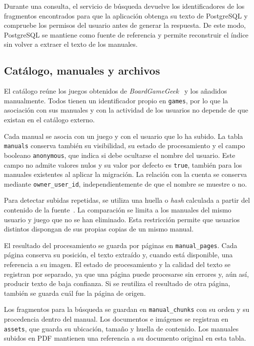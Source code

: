 Durante una consulta, el servicio de búsqueda devuelve los identificadores
de los fragmentos encontrados para que la aplicación obtenga su texto de
PostgreSQL y compruebe los permisos del usuario antes de generar la
respuesta. De este modo, PostgreSQL se mantiene como fuente de referencia
y permite reconstruir el índice sin volver a extraer el texto de los
manuales.

\FloatBarrier
\subsection{Catálogo, manuales y archivos}

El catálogo reúne los juegos obtenidos de \textit{BoardGameGeek}~\cite{boardgamegeek} y los añadidos
manualmente. Todos tienen un identificador propio en \texttt{games}, por lo
que la asociación con sus manuales y con la actividad de los usuarios no
depende de que existan en el catálogo externo.

Cada manual se asocia con un juego y con el usuario que lo ha subido. La tabla
\texttt{manuals} conserva también su visibilidad, su estado de procesamiento
y el campo booleano \texttt{anonymous}, que indica si debe ocultarse el nombre
del usuario. Este campo no admite valores nulos y su valor por defecto es
\texttt{true}, también para los manuales existentes al aplicar la migración.
La relación con la cuenta se conserva mediante \texttt{owner\_user\_id},
independientemente de que el nombre se muestre o no.

Para detectar subidas repetidas, se utiliza una huella o \textit{hash}
calculada a partir del contenido de la fuente~\cite{quinlan_venti}.
La comparación se limita a los manuales del mismo usuario y juego que no se
han eliminado.
Esta restricción permite que usuarios distintos dispongan de sus propias copias
de un mismo manual.

El resultado del procesamiento se guarda por páginas en
\texttt{manual\_\allowbreak{}pages}. Cada página conserva su posición, el texto
extraído y, cuando está disponible, una referencia a su imagen. El estado de
procesamiento y la calidad del texto se registran por separado, ya que una página puede
procesarse sin errores y, aún así, producir texto de baja confianza. Si se reutiliza
el resultado de otra página, también se guarda cuál fue la página de origen.

Los fragmentos para la búsqueda se guardan en
\texttt{manual\_\allowbreak{}chunks} con su orden y su procedencia dentro del
manual. Los documentos e imágenes se registran en
\texttt{assets}, que guarda su ubicación, tamaño y huella de contenido.
Los manuales subidos en \acs{PDF} mantienen una referencia a su documento
original en esta tabla.

